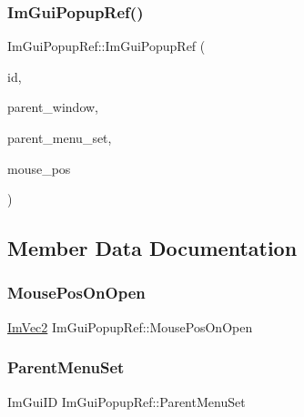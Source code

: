\subsubsection{\texorpdfstring{Im\+Gui\+Popup\+Ref()}{ImGuiPopupRef()}}
{\footnotesize\ttfamily Im\+Gui\+Popup\+Ref\+::\+Im\+Gui\+Popup\+Ref (\begin{DoxyParamCaption}\item[{Im\+Gui\+ID}]{id,  }\item[{\hyperlink{struct_im_gui_window}{Im\+Gui\+Window} $\ast$}]{parent\+\_\+window,  }\item[{Im\+Gui\+ID}]{parent\+\_\+menu\+\_\+set,  }\item[{const \hyperlink{struct_im_vec2}{Im\+Vec2} \&}]{mouse\+\_\+pos }\end{DoxyParamCaption})}



\subsection{Member Data Documentation}
\hypertarget{struct_im_gui_popup_ref_ae7640a4130be4ba7518aee17c500d366}{}\label{struct_im_gui_popup_ref_ae7640a4130be4ba7518aee17c500d366} 
\subsubsection{\texorpdfstring{Mouse\+Pos\+On\+Open}{MousePosOnOpen}}
{\footnotesize\ttfamily \hyperlink{struct_im_vec2}{Im\+Vec2} Im\+Gui\+Popup\+Ref\+::\+Mouse\+Pos\+On\+Open}

\hypertarget{struct_im_gui_popup_ref_afc2fc749bf54a0e3bab8defefe4a0a2b}{}\label{struct_im_gui_popup_ref_afc2fc749bf54a0e3bab8defefe4a0a2b} 
\subsubsection{\texorpdfstring{Parent\+Menu\+Set}{ParentMenuSet}}
{\footnotesize\ttfamily Im\+Gui\+ID Im\+Gui\+Popup\+Ref\+::\+Parent\+Menu\+Set}

\hypertarget{struct_im_gui_popup_ref_a7925cc312e5632661e0e6a2195af21b2}{}\label{struct_im_gui_popup_ref_a7925cc312e5632661e0e6a2195af21b2} 
